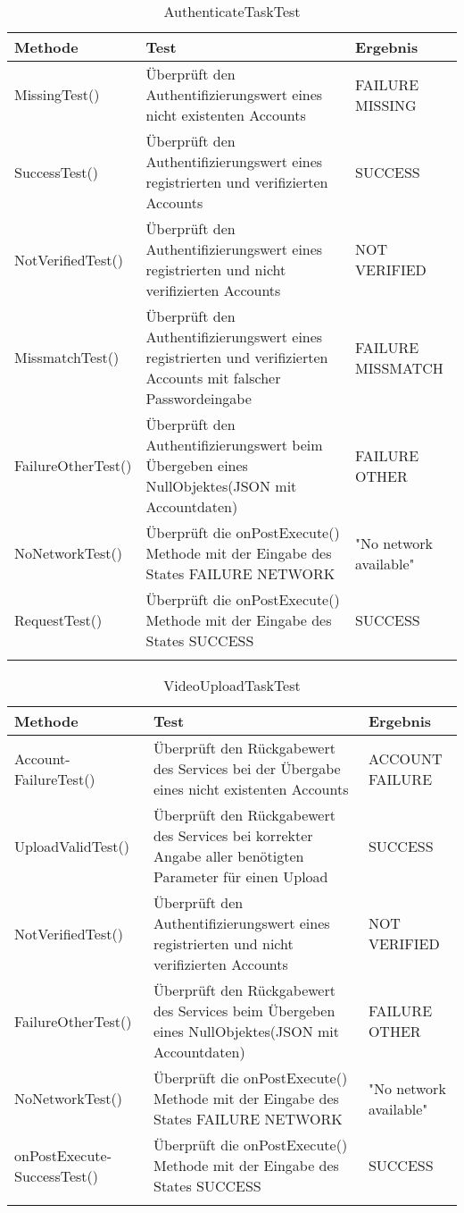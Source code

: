 \begin{longtable}{p{} | p{} | p{}}
\hline
  \textbf{Methode} & \textbf{Test} & \textbf{Ergebnis}\\
  \hline
  MissingTest() & Überprüft den Authentifizierungswert eines nicht existenten Accounts & FAILURE MISSING \\
  \hline
  SuccessTest() & Überprüft den Authentifizierungswert eines registrierten und verifizierten Accounts & SUCCESS \\
  \hline
  NotVerifiedTest() & Überprüft den Authentifizierungswert eines registrierten und nicht verifizierten Accounts & NOT VERIFIED \\
  \hline
  MissmatchTest() & Überprüft den Authentifizierungswert eines registrierten und verifizierten Accounts mit falscher Passwordeingabe & FAILURE MISSMATCH \\
  \hline
  FailureOtherTest() & Überprüft den Authentifizierungswert beim Übergeben eines NullObjektes(JSON mit Accountdaten) & FAILURE OTHER \\
  \hline
  NoNetworkTest() & Überprüft die onPostExecute() Methode mit der Eingabe des States FAILURE NETWORK & "No network available" \\
  \hline
  RequestTest() & Überprüft die onPostExecute() Methode mit der Eingabe des States SUCCESS & SUCCESS \\
  \caption{AuthenticateTaskTest}
 \end{longtable}
 
\begin{longtable}{p{} | p{} | p{}}
\hline
  \textbf{Methode} & \textbf{Test} & \textbf{Ergebnis}\\
  \hline
  Account- \newline FailureTest() & Überprüft den Rückgabewert des Services bei der Übergabe eines nicht existenten Accounts & ACCOUNT FAILURE \\
  \hline
  UploadValidTest() & Überprüft den Rückgabewert des Services bei korrekter Angabe aller benötigten Parameter für einen Upload  & SUCCESS \\
  \hline
  NotVerifiedTest() & Überprüft den Authentifizierungswert eines registrierten und nicht verifizierten Accounts & NOT VERIFIED \\
  \hline
  FailureOtherTest() & Überprüft den Rückgabewert des Services beim Übergeben eines NullObjektes(JSON mit Accountdaten) & FAILURE OTHER \\
  \hline
  NoNetworkTest() & Überprüft die onPostExecute() Methode mit der Eingabe des States FAILURE NETWORK & "No network available" \\
  \hline
  onPostExecute- \newline SuccessTest() & Überprüft die onPostExecute() Methode mit der Eingabe des States SUCCESS & SUCCESS \\
  \caption{VideoUploadTaskTest}
 \end{longtable}
 
 
                                                      
